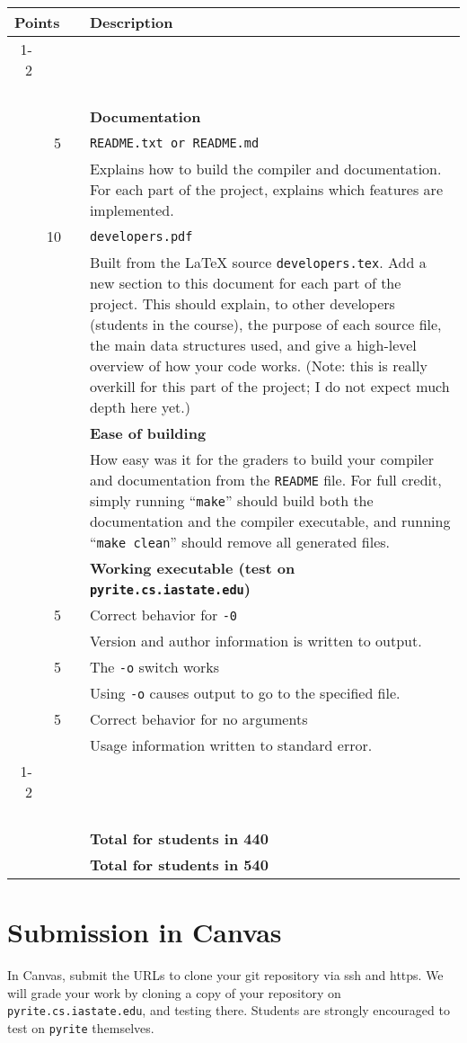 \documentclass{article}
\makeatletter
\newcommand{\gradeline}{ \cline{1-2} \cline{4-4} ~\\[-1.5ex] }
\newenvironment{gradetable}{\begin{longtable}{@{}rrcp{5in}} \multicolumn{2}{l}{\bf Points} & & {\bf Description}\\ \gradeline}{\end{longtable}}
\newcommand{\mainitem}[2]{\pagebreak[2] {\bf #1} &&& {\bf #2}}
\newcommand{\mainpara}[1]{~ &&& {#1} }
\newcommand{\inneritem}[2]{~ & #1 && #2}
\newcommand{\innerpara}[1]{~ & ~ && #1}
\makeatother
\begin{document}
\noindent
\begin{gradetable}
  \mainitem{15}{Documentation}
  \\[2mm]
  \inneritem{5}{\tt README.txt} or {\tt README.md}
  \\[2mm]
  \innerpara{%
    Explains how to build the compiler and documentation.
    For each part of the project,
    explains which features are implemented.
  }
  \\[2mm]
  \inneritem{10}{\tt developers.pdf}
  \\[2mm]
  \innerpara{%
    Built from the \LaTeX{} source {\tt developers.tex}.
    Add a new section to this document for each part of the project.
    This should explain, to other developers (students in the course),
    the purpose of each source file,
    the main data structures used,
    and give a high-level overview of how your code works.
    (Note: this is really overkill for this part of the project;
    I do not expect much depth here yet.)
  }
  \\[5mm]

  \mainitem{10}{Ease of building}
  \\[2mm]
  \mainpara{%
    How easy was it for the graders to build your compiler and
    documentation from the {\tt README} file.
    For full credit, simply running ``{\tt make}''
    should build both the documentation and the compiler executable,
    and running ``{\tt make clean}'' should remove
    all generated files.
  }
  \\[5mm]

  \mainitem{15}{Working executable (test on {\tt pyrite.cs.iastate.edu})}
  \\[2mm]
  \inneritem{5}{Correct behavior for {\tt -0}}
  \\[2mm]
  \innerpara{%
    Version and author information is written to output.
  }
  \\[3mm]
  \inneritem{5}{The {\tt -o} switch works}
  \\[2mm]
  \innerpara{%
    Using {\tt -o} causes output
    to go to the specified file.
  }
  \\[3mm]
  \inneritem{5}{Correct behavior for no arguments}
  \\[2mm]
  \innerpara{%
    Usage information written to standard error.
  }
  \\[3mm]
  \gradeline
  \mainitem{40}{Total for students in 440}
  \\
  \mainitem{40}{Total for students in 540}
\end{gradetable}


\section{Submission in Canvas}

In Canvas, submit the URLs to clone your git repository via ssh and https.
We will grade your work by cloning a copy of your repository
on {\tt pyrite.cs.iastate.edu}, and testing there.
Students are strongly encouraged to test on {\tt pyrite} themselves.
\end{document}
